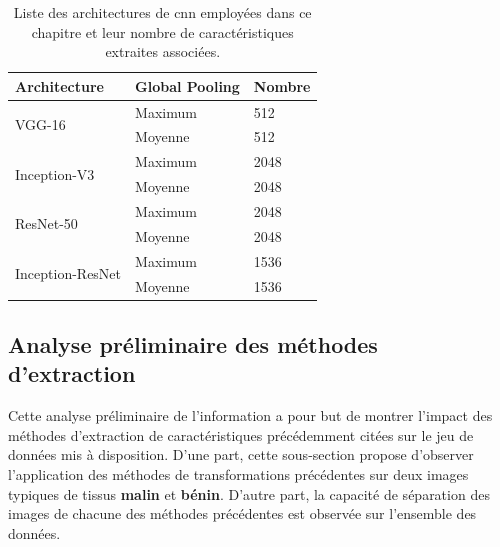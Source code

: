 \begin{table}[H]
    \centering
    \begin{tabular}{lll}
    \toprule
    \textbf{Architecture}               & Global Pooling   & \textbf{Nombre}    \\ \hline
    \multirow{2}{*}{VGG-16}             & Maximum          & 512                \\ \cline{2-3}
                                        & Moyenne          & 512                \\ \hline
    \multirow{2}{*}{Inception-V3}       & Maximum          & 2048               \\ \cline{2-3}
                                        & Moyenne          & 2048               \\ \hline
    \multirow{2}{*}{ResNet-50}          & Maximum          & 2048               \\ \cline{2-3}
                                        & Moyenne          & 2048               \\ \hline
    \multirow{2}{*}{Inception-ResNet}   & Maximum          & 1536               \\ \cline{2-3}
                                        & Moyenne          & 1536               \\
    \bottomrule
    \end{tabular}
    \caption{Liste des architectures de \gls{cnn} employées dans ce chapitre et leur nombre de caractéristiques extraites associées.}
    \label{tab:number_features_transferlearning}
\end{table}\par
\clearpage

\subsection{Analyse préliminaire des méthodes d'extraction}
Cette analyse préliminaire de l'information a pour but de montrer l'impact des méthodes d'extraction de caractéristiques précédemment citées sur le jeu de données mis à disposition. D'une part, cette sous-section propose d'observer l'application des méthodes de transformations précédentes sur deux images typiques de tissus \textbf{malin} et \textbf{bénin}. D'autre part, la capacité de séparation des images de chacune des méthodes précédentes est observée sur l'ensemble des données.\par

